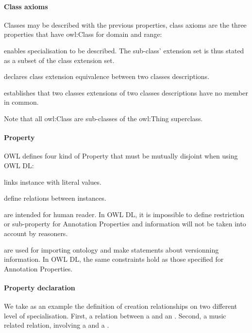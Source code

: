 \paragraph{Class axioms}
Classes may be described with the previous properties, class axioms are the three properties that have owl:Class for domain and range: 
\begin{liste}
	\item {} enables specialisation to be described. The sub-class' extension set is thus stated as a subset of the class extension set. 

	\item {} declares class extension equivalence between two classes descriptions.

	\item {} establishes that two classes extensions of two classes descriptions have no member in common.
\end{liste}
Note that all owl:Class are sub-classes of the owl:Thing superclass. 

\paragraph{Property}
OWL defines four kind of Property that must be mutually disjoint when using OWL DL:
\begin{liste}
	\item {} links instance with literal values.
	\item {} define relations between instances.
	\item {} are intended for human reader. 
	In OWL DL, it is impossible to define restriction or sub-property for Annotation Properties and information will not be taken into account by reasoners.
	\item {} are used for importing ontology and make statements about versionning information. 
	In OWL DL, the same constraints hold as those specified for Annotation Properties.
\end{liste}

\paragraph{Property declaration}
We take as an example the definition of creation relationships on two different level of specialisation. 
First, a  relation between a  and an . 
Second, a music related  relation, involving a  and a .

